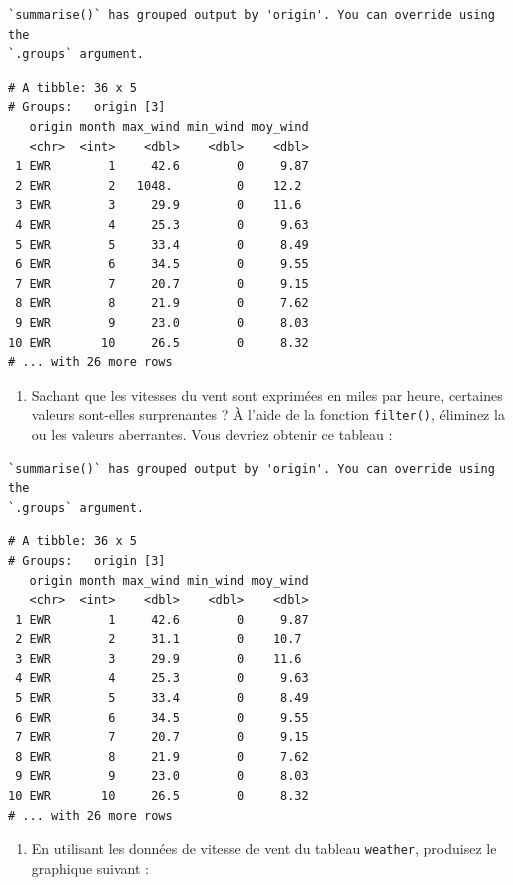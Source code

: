 \documentclass[
  a4paper,
  DIV=11,
  numbers=noendperiod,
  oneside]{scrreprt}
\providecommand{\tightlist}{%
  \setlength{\itemsep}{0pt}\setlength{\parskip}{0pt}}\usepackage{longtable,booktabs,array}
\begin{document}
\begin{verbatim}
`summarise()` has grouped output by 'origin'. You can override using the
`.groups` argument.
\end{verbatim}

\begin{verbatim}
# A tibble: 36 x 5
# Groups:   origin [3]
   origin month max_wind min_wind moy_wind
   <chr>  <int>    <dbl>    <dbl>    <dbl>
 1 EWR        1     42.6        0     9.87
 2 EWR        2   1048.         0    12.2 
 3 EWR        3     29.9        0    11.6 
 4 EWR        4     25.3        0     9.63
 5 EWR        5     33.4        0     8.49
 6 EWR        6     34.5        0     9.55
 7 EWR        7     20.7        0     9.15
 8 EWR        8     21.9        0     7.62
 9 EWR        9     23.0        0     8.03
10 EWR       10     26.5        0     8.32
# ... with 26 more rows
\end{verbatim}

\begin{enumerate}
\def\labelenumi{\arabic{enumi}.}
\setcounter{enumi}{3}
\tightlist
\item
  Sachant que les vitesses du vent sont exprimées en miles par heure,
  certaines valeurs sont-elles surprenantes ? À l'aide de la fonction
  \texttt{filter()}, éliminez la ou les valeurs aberrantes. Vous devriez
  obtenir ce tableau :
\end{enumerate}

\begin{verbatim}
`summarise()` has grouped output by 'origin'. You can override using the
`.groups` argument.
\end{verbatim}

\begin{verbatim}
# A tibble: 36 x 5
# Groups:   origin [3]
   origin month max_wind min_wind moy_wind
   <chr>  <int>    <dbl>    <dbl>    <dbl>
 1 EWR        1     42.6        0     9.87
 2 EWR        2     31.1        0    10.7 
 3 EWR        3     29.9        0    11.6 
 4 EWR        4     25.3        0     9.63
 5 EWR        5     33.4        0     8.49
 6 EWR        6     34.5        0     9.55
 7 EWR        7     20.7        0     9.15
 8 EWR        8     21.9        0     7.62
 9 EWR        9     23.0        0     8.03
10 EWR       10     26.5        0     8.32
# ... with 26 more rows
\end{verbatim}

\begin{enumerate}
\def\labelenumi{\arabic{enumi}.}
\setcounter{enumi}{4}
\tightlist
\item
  En utilisant les données de vitesse de vent du tableau
  \texttt{weather}, produisez le graphique suivant :
\end{enumerate}
\end{document}
